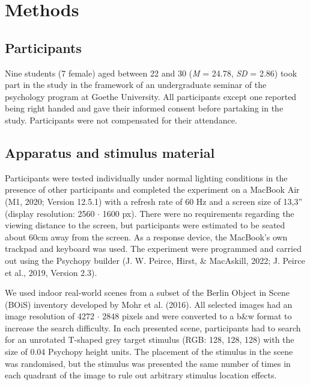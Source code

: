 \documentclass[
  man,floatsintext]{apa7}
\begin{document}
\newpage

\hypertarget{methods}{%
\section{Methods}\label{methods}}

\hypertarget{participants}{%
\subsection{Participants}\label{participants}}

Nine students (7 female) aged between 22 and 30 (\emph{M} = 24.78, \emph{SD} = 2.86) took part in the study in the framework of an undergraduate seminar of the psychology program at Goethe University. All participants except one reported being right handed and gave their informed consent before partaking in the study. Participants were not compensated for their attendance.

\hypertarget{apparatus-and-stimulus-material}{%
\subsection{Apparatus and stimulus material}\label{apparatus-and-stimulus-material}}

Participants were tested individually under normal lighting conditions in the presence of other participants and completed the experiment on a MacBook Air (M1, 2020; Version 12.5.1) with a refresh rate of 60 Hz and a screen size of 13,3'' (display resolution: 2560 \(\cdot\) 1600 px). There were no requirements regarding the viewing distance to the screen, but participants were estimated to be seated about 60cm away from the screen. As a response device, the MacBook's own trackpad and keyboard was used. The experiment were programmed and carried out using the Psychopy builder (J. W. Peirce, Hirst, \& MacAskill, 2022; J. Peirce et al., 2019, Version 2.3).

We used indoor real-world scenes from a subset of the Berlin Object in Scene (BOiS) inventory developed by Mohr et al. (2016). All selected images had an image resolution of 4272 \(\cdot\) 2848 pixels and were converted to a b\&w format to increase the search difficulty. In each presented scene, participants had to search for an unrotated T-shaped grey target stimulus (RGB: 128, 128, 128) with the size of 0.04 Psychopy height units. The placement of the stimulus in the scene was randomised, but the stimulus was presented the same number of times in each quadrant of the image to rule out arbitrary stimulus location effects.
\end{document}

